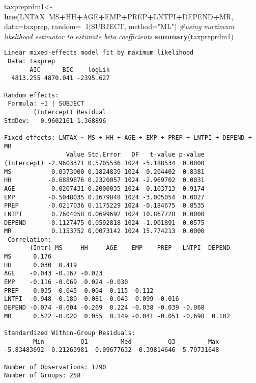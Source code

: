 \documentclass[]{book}
\newenvironment{Shaded}{\begin{snugshade}}{\end{snugshade}}
\newcommand{\CommentTok}[1]{\textcolor[rgb]{0.56,0.35,0.01}{\textit{#1}}}
\newcommand{\DataTypeTok}[1]{\textcolor[rgb]{0.13,0.29,0.53}{#1}}
\newcommand{\DecValTok}[1]{\textcolor[rgb]{0.00,0.00,0.81}{#1}}
\newcommand{\KeywordTok}[1]{\textcolor[rgb]{0.13,0.29,0.53}{\textbf{#1}}}
\newcommand{\NormalTok}[1]{#1}
\newcommand{\OperatorTok}[1]{\textcolor[rgb]{0.81,0.36,0.00}{\textbf{#1}}}
\newcommand{\StringTok}[1]{\textcolor[rgb]{0.31,0.60,0.02}{#1}}
\begin{document}
\begin{Shaded}
\begin{Highlighting}[]
\NormalTok{taxpreprdm1<-}\KeywordTok{lme}\NormalTok{(LNTAX}\OperatorTok{~}\NormalTok{MS}\OperatorTok{+}\NormalTok{HH}\OperatorTok{+}\NormalTok{AGE}\OperatorTok{+}\NormalTok{EMP}\OperatorTok{+}\NormalTok{PREP}\OperatorTok{+}\NormalTok{LNTPI}\OperatorTok{+}\NormalTok{DEPEND}\OperatorTok{+}\NormalTok{MR, }\DataTypeTok{data=}\NormalTok{taxprep, }\DataTypeTok{random=}\OperatorTok{~}\DecValTok{1}\OperatorTok{|}\NormalTok{SUBJECT, }\DataTypeTok{method=}\StringTok{"ML"}\NormalTok{) }\CommentTok{#using maximum likelihood estimator to estimate beta coefficients }
\KeywordTok{summary}\NormalTok{(taxpreprdm1)}
\end{Highlighting}
\end{Shaded}

\begin{verbatim}
Linear mixed-effects model fit by maximum likelihood
 Data: taxprep 
       AIC      BIC    logLik
  4813.255 4870.041 -2395.627

Random effects:
 Formula: ~1 | SUBJECT
        (Intercept) Residual
StdDev:   0.9602161 1.368896

Fixed effects: LNTAX ~ MS + HH + AGE + EMP + PREP + LNTPI + DEPEND + MR 
                 Value Std.Error   DF   t-value p-value
(Intercept) -2.9603371 0.5705536 1024 -5.188534  0.0000
MS           0.0373000 0.1824839 1024  0.204402  0.8381
HH          -0.6889876 0.2320057 1024 -2.969702  0.0031
AGE          0.0207431 0.2000035 1024  0.103713  0.9174
EMP         -0.5048035 0.1679848 1024 -3.005054  0.0027
PREP        -0.0217036 0.1175229 1024 -0.184675  0.8535
LNTPI        0.7604058 0.0699692 1024 10.867728  0.0000
DEPEND      -0.1127475 0.0592818 1024 -1.901891  0.0575
MR           0.1153752 0.0073142 1024 15.774213  0.0000
 Correlation: 
       (Intr) MS     HH     AGE    EMP    PREP   LNTPI  DEPEND
MS      0.176                                                 
HH      0.030  0.419                                          
AGE    -0.043 -0.167 -0.023                                   
EMP    -0.116 -0.069  0.024 -0.030                            
PREP   -0.035 -0.045  0.004 -0.115 -0.112                     
LNTPI  -0.948 -0.180 -0.081 -0.043  0.099 -0.016              
DEPEND -0.074 -0.604 -0.269  0.224 -0.038 -0.039 -0.068       
MR      0.522 -0.020  0.055  0.149 -0.041 -0.051 -0.698  0.102

Standardized Within-Group Residuals:
        Min          Q1         Med          Q3         Max 
-5.83483692 -0.21263981  0.09677632  0.39814646  5.79731648 

Number of Observations: 1290
Number of Groups: 258 
\end{verbatim}
\end{document}
